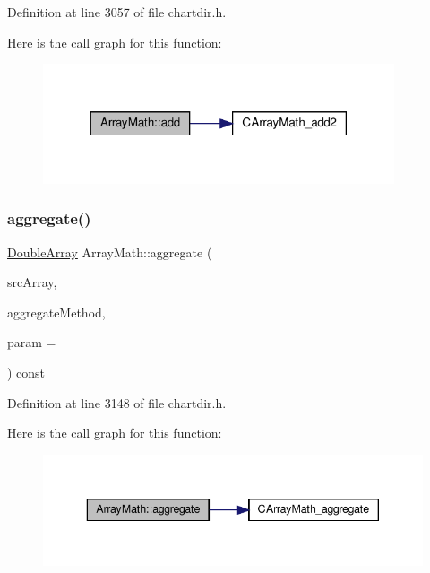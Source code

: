 Definition at line 3057 of file chartdir.\+h.

Here is the call graph for this function\+:
\nopagebreak
\begin{figure}[H]
\begin{center}
\leavevmode
\includegraphics[width=294pt]{class_array_math_a3ebc72308c94fd2ea7dbf1407e8c9eeb_cgraph}
\end{center}
\end{figure}
\mbox{\label{class_array_math_aa4b11f4895afbf51a60e099baf16f5a3}} 
\subsubsection{\texorpdfstring{aggregate()}{aggregate()}}
{\footnotesize\ttfamily \hyperlink{class_double_array}{Double\+Array} Array\+Math\+::aggregate (\begin{DoxyParamCaption}\item[{\hyperlink{class_double_array}{Double\+Array}}]{src\+Array,  }\item[{int}]{aggregate\+Method,  }\item[{double}]{param = {} }\end{DoxyParamCaption}) const\hspace{0.3cm}{\ttfamily [inline]}}



Definition at line 3148 of file chartdir.\+h.

Here is the call graph for this function\+:
\nopagebreak
\begin{figure}[H]
\begin{center}
\leavevmode
\includegraphics[width=343pt]{class_array_math_aa4b11f4895afbf51a60e099baf16f5a3_cgraph}
\end{center}
\end{figure}
\mbox{\label{class_array_math_a1ecf90f00ed56f8b977f1ed5a3a6d7fa}} 
